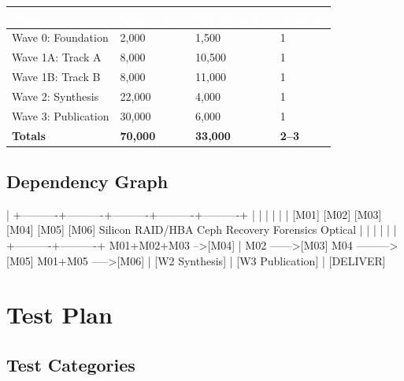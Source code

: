 \documentclass[11pt,letterpaper]{article}
\newcommand{\tableheader}[1]{\textbf{\sffamily\textcolor{white}{#1}}}
\begin{document}
\begin{center}
\begin{tabularx}{\textwidth}{L{3cm}C{2cm}C{2cm}C{2cm}}
\toprule
{}
\tableheader{Wave} & \tableheader{Input (est.)} & \tableheader{Output (est.)} & \tableheader{Sessions} \\
\midrule
Wave 0: Foundation & 2,000 & 1,500 & 1 \\
Wave 1A: Track A & 8,000 & 10,500 & 1 \\
Wave 1B: Track B & 8,000 & 11,000 & 1 \\
Wave 2: Synthesis & 22,000 & 4,000 & 1 \\
Wave 3: Publication & 30,000 & 6,000 & 1 \\
\midrule
{}
\textbf{Totals} & \textbf{70,000} & \textbf{33,000} & \textbf{2--3} \\
\bottomrule
\end{tabularx}
\end{center}

\subsection{Dependency Graph}

\begin{asciibox}
[W0 Foundation]
      |
      +----------+----------+----------+----------+----------+
      |          |          |          |          |          |
    [M01]      [M02]      [M03]      [M04]      [M05]      [M06]
  Silicon     RAID/HBA    Ceph      Recovery   Forensics  Optical
      |          |          |          |          |          |
      +----------+----------+    M01+M02+M03 -->[M04]        |
                 M02 ------>[M03]              M04 --------->[M05]
                                               M01+M05 ----->[M06]
                                                    |
                                               [W2 Synthesis]
                                                    |
                                            [W3 Publication]
                                                    |
                                               [DELIVER]
\end{asciibox}

\section{Test Plan}

\subsection{Test Categories}
\end{document}

